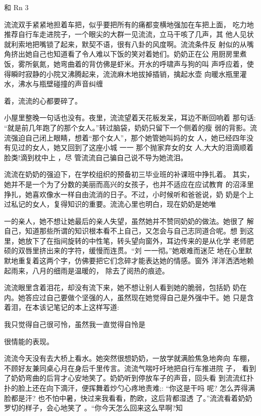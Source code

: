 \documentclass{article}
\begin{document}
和 Rn 3 

流流双手紧紧地担着车把，似乎要把所有的痛都变横地强加在车把上面，
吃力地推荐自行车走进院子，一个眼尖的大群一见流流，立马干咳了几声，其
他人见状就利索地把嘴锁了起来，默契不语，很有八卦的风度啊。流流条件反
射似的从嘴角挤出她自己也知道看了令人难以下饭的笑对着她们。奶奶正在公
用厨房里煮饭，雾所氨氮，她弯曲着的背仿佛是虾米。开水的呼啸声与狗的叫
声呼应着，使得瞬时寂静的小院又沸腾起来，流流麻木地拔掉插销，擒起水壶
向暖水瓶里灌水，沸水与瓶壁碰撞的声音纠缠
\newpage

着，流流的心都要碎了。 

小屋里整晚一句话也没有。夜里，流流望着天花板发呆，耳边不断回响着
那句话: “就是前几年跑了的那个女人。”转过脑袋，奶奶只留下一个侧着的瘦
弱的背影。流流强迫自己闭上眼睛，想着“那个女人”，那个她管她叫妈的女
人，她已经四年没有见过的女人，她又回到了这座小城 一一 那个抛家弃女的女
人,大大的泪滴顺着脸类!滴到枕中上 ，尽
管流流自己骗自己说不导为她流泪。 

流流在奶奶的强迫下，在学校组织的预备初三毕业班的补课班中挣扎着。
其实，她并不是一个为了分数的美丽而高兴的女孩子，也并不适应在应试教育
的沼泽里挣扎，她喜欢像水一样自由流消的日子。不过，小时候听和爸爸说，奶
奶是个上过私记的女人，复得知识的重要。流流心里也明白，现在奶奶是她唯
\newpage

一的亲人，她不想让她最后的亲人失望，虽然她并不赞同奶奶的做法。她很了
解自己，知道那些所谓的知识根本看不上自己，又怎会与自己志同道合呢。想
到这里，她放下了在指间旋转的中性笔，转头望向窗外，耳边传来的是从化学
老师肥硕的双唇里挤出来的字符，缓慢而连贯。“刘 一一彻。”她艰难而迷茫
地在心里默默地重复着这两个字，仿佛要把它们念碎才能表达她的情感。窗外
洋洋洒洒地赖起雨来，八月的细雨是温暖的，
除去了阅热的痕迹。 

流流眼里含着泪花，却没有流下来，她不想让别人看到她的脆弱，包括奶
奶在内。她答应过自己要做个坚强的人，虽然现在她觉得自己是外强中干。她
只是含着泪，在本该记笔记的本上这样写道:
 

我只觉得自己很可怜，虽然我一直觉得自怜是
\newpage

很情能的表现。 

流流今天没有去大桥上看水。她突然很想奶奶，一放学就满脸焦急地奔向
车棚，不顾好友兼同桌心月在身后千里传言。流流气喘吁吁地把自行车推进院
子， 看到了奶奶弯曲的后背才心安地笑了。奶奶听到停放车子的声音，回头看
到流流红扑扑的脸上还在向下滴汗，便挥舞着炒勺心疼地责难;: “你这是干吗
呢? 怎么弄得满脸都是汗? 也不怕中暑，快过来我看看，酌欧，这后背都湿透
了。”流流看着奶奶罗切的样子，会心地笑了
。“你今天怎么回来这么早啊?知 
\end{document}
